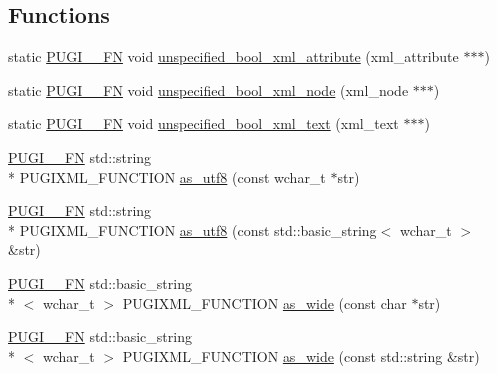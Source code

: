 \subsection*{Functions}
\begin{DoxyCompactItemize}
\item 
static \hyperlink{pugixml_8cpp_a82c335af3ca48cdb209c506bf8dd6ad2}{P\-U\-G\-I\-\_\-\-\_\-\-F\-N} void \hyperlink{namespacepugi_a8effe3a6fc7cc9c1cf2550739dbdc438}{unspecified\-\_\-bool\-\_\-xml\-\_\-attribute} (xml\-\_\-attribute $\ast$$\ast$$\ast$)
\item 
static \hyperlink{pugixml_8cpp_a82c335af3ca48cdb209c506bf8dd6ad2}{P\-U\-G\-I\-\_\-\-\_\-\-F\-N} void \hyperlink{namespacepugi_a487b2e720a3808d6fd5730d7c97bcdac}{unspecified\-\_\-bool\-\_\-xml\-\_\-node} (xml\-\_\-node $\ast$$\ast$$\ast$)
\item 
static \hyperlink{pugixml_8cpp_a82c335af3ca48cdb209c506bf8dd6ad2}{P\-U\-G\-I\-\_\-\-\_\-\-F\-N} void \hyperlink{namespacepugi_acfae514de3abac05ed155e531a401c15}{unspecified\-\_\-bool\-\_\-xml\-\_\-text} (xml\-\_\-text $\ast$$\ast$$\ast$)
\item 
\hyperlink{pugixml_8cpp_a82c335af3ca48cdb209c506bf8dd6ad2}{P\-U\-G\-I\-\_\-\-\_\-\-F\-N} std\-::string \\*
P\-U\-G\-I\-X\-M\-L\-\_\-\-F\-U\-N\-C\-T\-I\-O\-N \hyperlink{namespacepugi_a390bb44f7ba92b1a8a4f9157799d2ca8}{as\-\_\-utf8} (const wchar\-\_\-t $\ast$str)
\item 
\hyperlink{pugixml_8cpp_a82c335af3ca48cdb209c506bf8dd6ad2}{P\-U\-G\-I\-\_\-\-\_\-\-F\-N} std\-::string \\*
P\-U\-G\-I\-X\-M\-L\-\_\-\-F\-U\-N\-C\-T\-I\-O\-N \hyperlink{namespacepugi_ab4be9ab3dc86b13599b9f2fd2f778dfb}{as\-\_\-utf8} (const std\-::basic\-\_\-string$<$ wchar\-\_\-t $>$ \&str)
\item 
\hyperlink{pugixml_8cpp_a82c335af3ca48cdb209c506bf8dd6ad2}{P\-U\-G\-I\-\_\-\-\_\-\-F\-N} std\-::basic\-\_\-string\\*
$<$ wchar\-\_\-t $>$ P\-U\-G\-I\-X\-M\-L\-\_\-\-F\-U\-N\-C\-T\-I\-O\-N \hyperlink{namespacepugi_ac2a9782a1c3c725703c6e4533e735d9b}{as\-\_\-wide} (const char $\ast$str)
\item 
\hyperlink{pugixml_8cpp_a82c335af3ca48cdb209c506bf8dd6ad2}{P\-U\-G\-I\-\_\-\-\_\-\-F\-N} std\-::basic\-\_\-string\\*
$<$ wchar\-\_\-t $>$ P\-U\-G\-I\-X\-M\-L\-\_\-\-F\-U\-N\-C\-T\-I\-O\-N \hyperlink{namespacepugi_af33046c0db1ff7b3f63327d32fc6dca7}{as\-\_\-wide} (const std\-::string \&str)
\item 

\end{DoxyCompactItemize}
